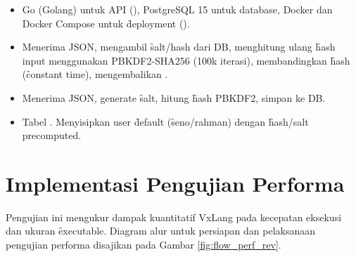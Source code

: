 \begin{itemize}
    \item {} Go (Golang) untuk API (), PostgreSQL 15 untuk database, Docker dan Docker Compose untuk \f{deployment} ().
    \item {} Menerima JSON, mengambil \f{salt/hash} dari DB, menghitung ulang \f{hash} input menggunakan PBKDF2-SHA256 (100k iterasi), membandingkan \f{hash} (\f{constant time}), mengembalikan .
    \item {} Menerima JSON, generate \f{salt}, hitung \f{hash} PBKDF2, simpan ke DB.
    \item {} Tabel . Menyisipkan user \f{default} (\f{seno}/rahman) dengan \f{hash/salt} precomputed.
\end{itemize}

\section{Implementasi Pengujian Performa}
Pengujian ini mengukur dampak kuantitatif VxLang pada kecepatan eksekusi dan ukuran \f{executable}. Diagram alur untuk persiapan dan pelaksanaan pengujian performa disajikan pada Gambar \ref{fig:flow_perf_rev}.


